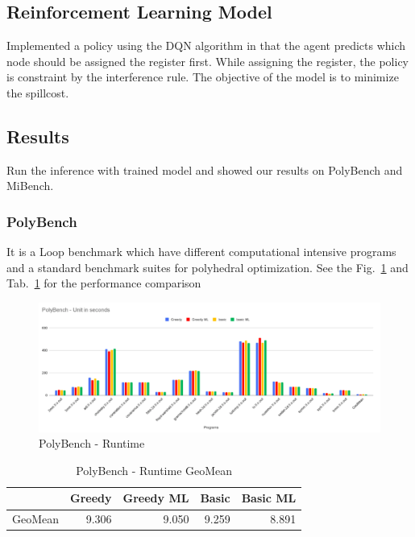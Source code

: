 \subsection{Reinforcement Learning Model}
Implemented a policy using the DQN algorithm in that the agent predicts which node should be assigned the register first.  While assigning the register, the policy is constraint by the interference rule. The objective of the model is to minimize the spillcost.

\subsection{Results}

Run the inference with trained model and showed our results on PolyBench and MiBench\cite{mibench}.
\subsubsection{PolyBench}
It is a Loop benchmark which have different computational intensive programs and a standard benchmark suites for polyhedral optimization. See the Fig.~\ref{fig:mlra-polybench} and Tab.~\ref{tab:mlra:polybench} for the performance comparison

\begin{figure}[t]
    \centering
    \includegraphics[scale=0.4]{figures/chapter-5/polybench.png}
    \caption{PolyBench - Runtime}
     \label{fig:mlra-polybench}
\end{figure}


\begin{table}[h]
\begin{tabular}{|l|l|l|l|l|}
\hline
 & \textbf{Greedy} & \textbf{Greedy ML} & \textbf{Basic} & \textbf{Basic ML} \\ \hline
GeoMean & \multicolumn{1}{r|}{9.306} & \multicolumn{1}{r|}{9.050} & \multicolumn{1}{r|}{9.259} & \multicolumn{1}{r|}{8.891} \\ \hline
\end{tabular}
\centering
\caption{PolyBench - Runtime GeoMean}
\label{tab:mlra:polybench}
\end{table}


